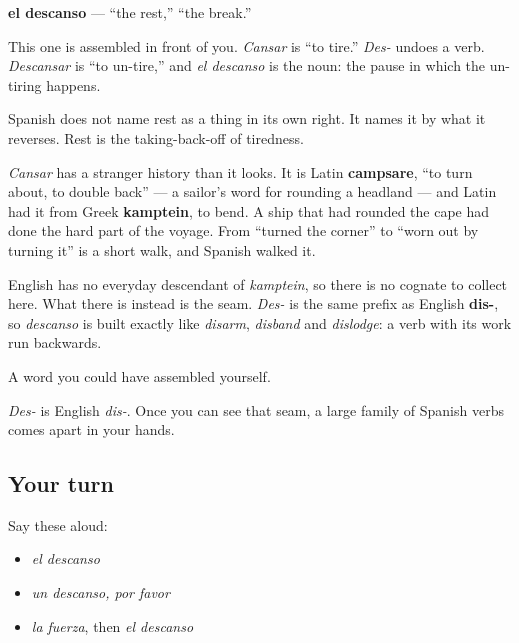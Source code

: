 \begin{cousinweb}
\textbf{el descanso} — \textquotedblleft{}the rest,\textquotedblright{} \textquotedblleft{}the break.\textquotedblright{}

This one is assembled in front of you. \emph{Cansar} is \textquotedblleft{}to tire.\textquotedblright{} \emph{Des-} undoes a verb. \emph{Descansar} is \textquotedblleft{}to un-tire,\textquotedblright{} and \emph{el descanso} is the noun: the pause in which the un-tiring happens.

Spanish does not name rest as a thing in its own right. It names it by what it reverses. Rest is the taking-back-off of tiredness.

\emph{Cansar} has a stranger history than it looks. It is Latin \textbf{campsare}, \textquotedblleft{}to turn about, to double back\textquotedblright{} — a sailor's word for rounding a headland — and Latin had it from Greek \textbf{kamptein}, to bend. A ship that had rounded the cape had done the hard part of the voyage. From \textquotedblleft{}turned the corner\textquotedblright{} to \textquotedblleft{}worn out by turning it\textquotedblright{} is a short walk, and Spanish walked it.

English has no everyday descendant of \emph{kamptein}, so there is no cognate to collect here. What there is instead is the seam. \emph{Des-} is the same prefix as English \textbf{dis-}, so \emph{descanso} is built exactly like \emph{disarm}, \emph{disband} and \emph{dislodge}: a verb with its work run backwards.
\end{cousinweb}

\begin{grammarlens}[title={What you've built}]
A word you could have assembled yourself.

\emph{Des-} is English \emph{dis-}. Once you can see that seam, a large family of Spanish verbs comes apart in your hands.
\end{grammarlens}

\subsection*{Your turn}
Say these aloud:

\begin{itemize}
\raggedright
  \item \emph{el descanso}
  \item \emph{un descanso, por favor}
  \item \emph{la fuerza}, then \emph{el descanso}
\end{itemize}

